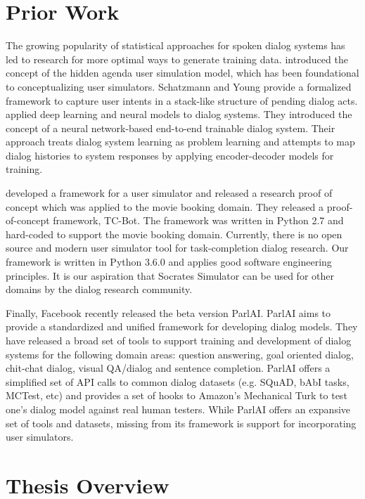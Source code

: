 \section{Prior Work}
\label{sec:priorworks}

The growing popularity of statistical approaches for spoken dialog systems has led to research for more optimal ways to generate training data. \cite{Schatzmann2009TheHA} introduced the concept of the hidden agenda user simulation model, which has been foundational to conceptualizing user simulators. Schatzmann and Young provide a formalized framework to capture user intents in a stack-like structure of pending dialog acts. \cite{BordesW16} applied deep learning and neural models to dialog systems. They introduced the concept of a neural network-based end-to-end trainable dialog system. Their approach treats dialog system learning as problem learning and attempts to map dialog histories to system responses by applying encoder-decoder models for training. 

\cite{li_usersim} developed a framework for a user simulator and released a research proof of concept which was applied to the movie booking domain. They released a proof-of-concept framework, TC-Bot. The framework was written in Python 2.7 and hard-coded to support the movie booking domain. Currently, there is no open source and modern user simulator tool for task-completion dialog research. Our framework is written in Python 3.6.0 and applies good software engineering principles. It is our aspiration that Socrates Simulator can be used for other domains by the dialog research community. 

Finally, Facebook recently released the beta version ParlAI. ParlAI aims to provide a standardized and unified framework for developing dialog models. They have released a broad set of tools to support training and development of dialog systems for the following domain areas: question answering, goal oriented dialog, chit-chat dialog, visual QA/dialog and sentence completion. ParlAI offers a simplified set of API calls to common dialog datasets (e.g. SQuAD, bAbI tasks, MCTest, etc) and provides a set of hooks to Amazon's Mechanical Turk to test one’s dialog model against real human testers. While ParlAI offers an expansive set of tools and datasets, missing from its framework is support for incorporating user simulators. 

\section{Thesis Overview}

